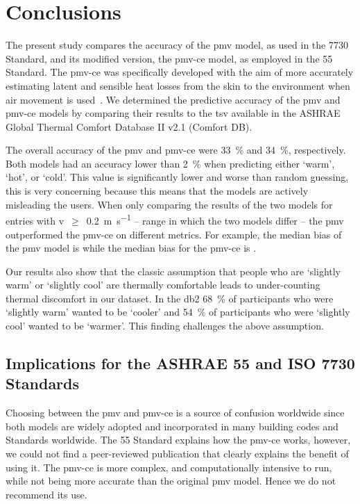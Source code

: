 \section{Conclusions}\label{sec:conclusions}
The present study compares the accuracy of the \ac{pmv} model, as used in the \gls{7730} Standard, and its modified version, the \ac{pmv-ce} model, as employed in the \gls{55} Standard.
The \ac{pmv-ce} was specifically developed with the aim of more accurately estimating latent and sensible heat losses from the skin to the environment when air movement is used~\cite{arens_moving_2009}.
We determined the predictive accuracy of the \ac{pmv} and \ac{pmv-ce} models by comparing their results to the \ac{tsv} available in the ASHRAE Global Thermal Comfort Database II v2.1 (Comfort DB).

The overall accuracy of the \ac{pmv} and \ac{pmv-ce} were \qty{33}{\percent} and \qty{34}{\percent}, respectively.
Both models had an accuracy lower than \qty{2}{\percent} when predicting either `warm', `hot', or `cold'.
This value is significantly lower and worse than random guessing, this is very concerning because this means that the models are actively misleading the users.
When only comparing the results of the two models for entries with \ac{v}~$\geq$~\qty{0.2}{\m\per\s} -- range in which the two models differ -- the \ac{pmv} outperformed the \ac{pmv-ce} on different metrics.
For example, the median bias of the \ac{pmv} model is  while the median bias for the \ac{pmv-ce} is .

Our results also show that the classic assumption that people who are `slightly warm' or `slightly cool' are thermally comfortable leads to under-counting thermal discomfort in our dataset.
In the \ac{db2} \qty{68}{\percent} of participants who were `slightly warm' wanted to be `cooler' and \qty{54}{\percent} of participants who were `slightly cool' wanted to be `warmer'.
This finding challenges the above assumption.

\subsection{Implications for the ASHRAE 55 and ISO 7730 Standards}\label{subsec:implications-for-the-ashrae-55-and-iso-7730-standards}
Choosing between the \ac{pmv} and \ac{pmv-ce} is a source of confusion worldwide since both models are widely adopted and incorporated in many building codes and Standards worldwide.
The \gls{55} Standard explains how the \ac{pmv-ce} works, however, we could not find a peer-reviewed publication that clearly explains the benefit of using it.
The \ac{pmv-ce} is more complex, and computationally intensive to run, while not being more accurate than the original \ac{pmv} model.
Hence we do not recommend its use.

